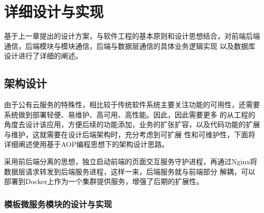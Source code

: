 
\chapter{详细设计与实现}
基于上一章提出的设计方案，与软件工程的基本原则和设计思想结合，对前端后端通信，后端模块与模块通信，后端与数据层通信的具体业务逻辑实现
以及数据库设计进行了详细的阐述。


\section{架构设计}
由于公有云服务的特殊性，相比较于传统软件系统主要关注功能的可用性，还需要系统做到部署轻便、易维护、高可用、高性能。因此，因此需要更多
的从工程的角度去设计该应用，方便后续的功能添加，业务的扩张扩容，以及代码功能的扩展与维护，这就需要在设计后端架构时，充分考虑到可扩展
性和可维护性，下面将详细阐述使用基于AOP编程思想下的架构设计思路\cite{zw9}。

采用前后端分离的思想，独立启动前端的页面交互服务守护进程，再通过Nginx将数据层请求转发到后端服务进程，这样一来，后端服务就与前端部分
解耦，可以部署到Docker上作为一个集群提供服务，增强了后期的扩展性\cite{zw8}。



%

\subsection{模板微服务模块的设计与实现}
